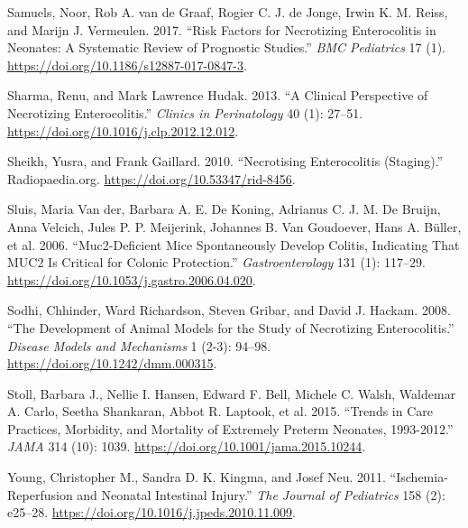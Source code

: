\documentclass[
]{article}
\newlength{\cslhangindent}
\newlength{\cslentryspacingunit} %
\newenvironment{CSLReferences}[2] %
 {%
  \setlength{\parindent}{0pt}
  \ifodd #1
  \let\oldpar\par
  \def\par{\hangindent=\cslhangindent\oldpar}
  \fi
  \setlength{\parskip}{#2\cslentryspacingunit}
 }%
 {}
\begin{document}
\begin{CSLReferences}{1}{0}
\leavevmode{}%
Samuels, Noor, Rob A. van de Graaf, Rogier C. J. de Jonge, Irwin K. M. Reiss, and Marijn J. Vermeulen. 2017. {``Risk Factors for Necrotizing Enterocolitis in Neonates: A Systematic Review of Prognostic Studies.''} \emph{{BMC} Pediatrics} 17 (1). \url{https://doi.org/10.1186/s12887-017-0847-3}.

\leavevmode{}%
Sharma, Renu, and Mark Lawrence Hudak. 2013. {``A Clinical Perspective of Necrotizing Enterocolitis.''} \emph{Clinics in Perinatology} 40 (1): 27--51. \url{https://doi.org/10.1016/j.clp.2012.12.012}.

\leavevmode{}%
Sheikh, Yusra, and Frank Gaillard. 2010. {``Necrotising Enterocolitis (Staging).''} Radiopaedia.org. \url{https://doi.org/10.53347/rid-8456}.

\leavevmode{}%
Sluis, Maria Van der, Barbara A. E. De Koning, Adrianus C. J. M. De Bruijn, Anna Velcich, Jules P. P. Meijerink, Johannes B. Van Goudoever, Hans A. Büller, et al. 2006. {``Muc2-Deficient Mice Spontaneously Develop Colitis, Indicating That {MUC}2 Is Critical for Colonic Protection.''} \emph{Gastroenterology} 131 (1): 117--29. \url{https://doi.org/10.1053/j.gastro.2006.04.020}.

\leavevmode{}%
Sodhi, Chhinder, Ward Richardson, Steven Gribar, and David J. Hackam. 2008. {``The Development of Animal Models for the Study of Necrotizing Enterocolitis.''} \emph{Disease Models and Mechanisms} 1 (2-3): 94--98. \url{https://doi.org/10.1242/dmm.000315}.

\leavevmode{}%
Stoll, Barbara J., Nellie I. Hansen, Edward F. Bell, Michele C. Walsh, Waldemar A. Carlo, Seetha Shankaran, Abbot R. Laptook, et al. 2015. {``Trends in Care Practices, Morbidity, and Mortality of Extremely Preterm Neonates, 1993-2012.''} \emph{{JAMA}} 314 (10): 1039. \url{https://doi.org/10.1001/jama.2015.10244}.

\leavevmode{}%
Young, Christopher M., Sandra D. K. Kingma, and Josef Neu. 2011. {``Ischemia-Reperfusion and Neonatal Intestinal Injury.''} \emph{The Journal of Pediatrics} 158 (2): e25--28. \url{https://doi.org/10.1016/j.jpeds.2010.11.009}.

\end{CSLReferences}
\end{document}
